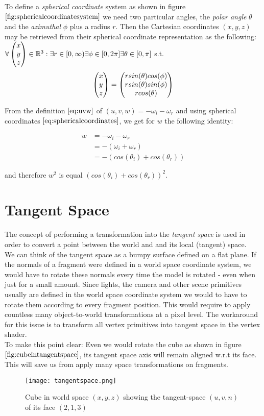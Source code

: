 To define a \emph{spherical coordinate} system as shown in figure $\ref{fig:sphericalcoordinatesystem}$ we need two particular angles, the \emph{polar angle} $\theta$ and the \emph{azimuthal} $\phi$ plus a radius $r$. Then the Cartesian coordinates $(x,y,z)$ may be retrieved from their spherical coordinate representation as the following: $\forall \colvec[x]{y}{z} \in \mathbb{R}^3 : \exists r \in [0,\infty) \exists \phi \in [0,2\pi] \exists \theta \in [0,\pi] $ s.t.
\begin{equation*}
\colvec[x]{y}{z} = \colvec[r sin(\theta)cos(\phi)]{r sin(\theta)sin(\phi)}{r cos(\theta)}
\label{eq:sphericalcoordinates}
\end{equation*}

\label{sec:componentw}
From the definition $\ref{eq:uvw}$ of $(u,v,w)= -\omega_i - \omega_r$ and using spherical coordinates $\ref{eq:sphericalcoordinates}$, we get for $w$ the following identity:

\begin{align}
w 
&= -\omega_i - \omega_r \nonumber \\ 
&= -(\omega_i + \omega_r) \nonumber \\
&= -\left( cos(\theta_i)+cos(\theta_r) \right) 
\label{eq:sphericalomega}
\end{align}

and therefore $w^2$ is equal $(cos(\theta_i)+cos(\theta_r))^2$. 

\section{Tangent Space}
\label{sec:tangentspace}
The concept of performing a transformation into the \emph{tangent space} is used in order to convert a point between the world and and its local (tangent) space.  \\

We can think of the tangent space as a bumpy surface defined on a flat plane. If the normals of a fragment were defined in a world space coordinate system, we would have to rotate these normals every time the model is rotated - even when just for a small amount. Since lights, the camera and other scene primitives usually are defined in the world space coordinate system we would to have to rotate them according to every fragment position. This would require to apply countless many object-to-world transformations at a pixel level. The workaround for this issue is to transform all vertex primitives into tangent space in the vertex shader. \\

To make this point clear: Even we would rotate the cube as shown in figure $\ref{fig:cubeintangentspace}$, its tangent space axis will remain aligned w.r.t its face. This will save us from apply many space transformations on fragments.

\begin{figure}[H]
  \centering
  \texttt{[image: tangentspace.png]}
  \caption[Illustration of a Tangent Space]{Cube in world space $(x,y,z)$ showing the tangent-space $(u,v,n)$ of its face $(2,1,3)$}
  \label{fig:cubeintangentspace}
\end{figure}
